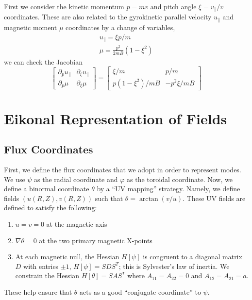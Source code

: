 \documentclass[]{article}
\begin{document}
First we consider the kinetic momentum \(p = mv\) and pitch angle \(\xi = v_\parallel / v\) coordinates.
These are also related to the gyrokinetic parallel velocity \(u_\parallel\) and magnetic moment \(\mu\) coordinates by a change of variables,
\begin{equation*}
	\begin{gathered}
		u_\parallel = \xi p / m \\
		\mu = \frac{p^2}{2mB} (1-\xi^2)
	\end{gathered}
\end{equation*}
we can check the Jacobian
\begin{equation*}
	\begin{bmatrix}
		\partial_p u_\parallel & \partial_\xi u_\parallel \\
		\partial_p \mu & \partial_\xi \mu
	\end{bmatrix} =
	\begin{bmatrix}
		\xi / m & p / m \\
		p(1-\xi^2) / mB & -p^2 \xi / mB
	\end{bmatrix}
\end{equation*}


\section{Eikonal Representation of Fields}

\subsection{Flux Coordinates}
First, we define the flux coordinates that we adopt in order to represent modes.
We use \(\psi\) as the radial coordinate and \(\varphi\) as the toroidal coordinate.
Now, we define a binormal coordinate \(\theta\) by a ``UV mapping'' strategy.
Namely, we define fields \((u(R,Z), v(R,Z))\) such that \(\theta = \arctan(v/u)\).
These UV fields are defined to satisfy the following:
\begin{enumerate}
	\item \(u=v=0\) at the magnetic axis
	\item \(\nabla \theta = 0\) at the two primary magnetic X-points
	\item At each magnetic null, the Hessian \(H[\psi]\) is congruent to a diagonal matrix \(D\) with entries \(\pm 1\), \(H[\psi] = S D S^T\); this is Sylvester's law of inertia. We constrain the Hessian \(H[\theta] = S A S^T\) where \(A_{11} = A_{22} = 0\) and \(A_{12}=A_{21} = a\).
\end{enumerate}
These help ensure that \(\theta\) acts as a good ``conjugate coordinate'' to \(\psi\).
\end{document}
